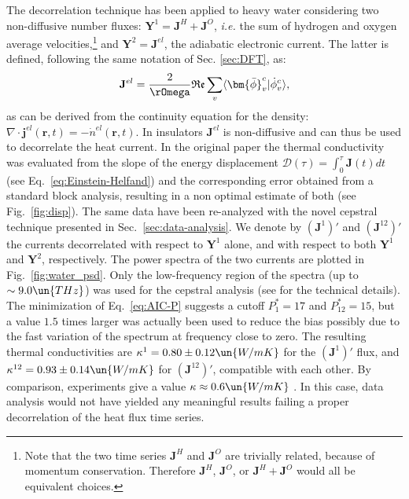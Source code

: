 The decorrelation technique has been applied to heavy water considering two non-diffusive number fluxes: $\mathbf{Y}^1 = \mathbf{J}^H + \mathbf{J}^O$,  \emph{i.e.} the sum of hydrogen and oxygen average velocities,\footnote{Note that the two time series $\mathbf{J}^H$ and $\mathbf{J}^O$ are trivially related, because of momentum conservation. Therefore $\mathbf{J}^H$, $\mathbf{J}^O$, or $\mathbf{J}^H+\mathbf{J}^O$ would all be equivalent choices.} and $\mathbf{Y}^2 = \mathbf{J}^{el}$, the adiabatic electronic current. The latter is defined, following the same notation of Sec. \ref{sec:DFT}, as:
\begin{equation}
 \mathbf J^{el} = \frac{2}{\rOmega}\mathfrak{Re} \sum_{v} \langle\bm{\bar \phi}_v^c |\dot \phi_v^c \rangle ,
\end{equation}
as can be derived from the continuity equation for the density: $\nabla\cdot \bm j^{el}(\bm r,t) =- \dot{n}^{el}(\bm r,t)$. In insulators $\mathbf J^{el}$ is non-diffusive and can thus be used to decorrelate the heat current. In the original paper the thermal conductivity was evaluated from the slope of the energy displacement $\mathcal{D}(\tau)=\int_0^\tau \mathbf{J}(t)dt$ (see Eq.~\eqref{eq:Einstein-Helfand}) and the corresponding error obtained from a standard block analysis, resulting in a non optimal estimate of both (see Fig.~\ref{fig:disp}). The same data have been re-analyzed with the novel cepstral technique presented in Sec.~\ref{sec:data-analysis}. We denote by $\left( \mathbf{J}^1\right)'$ and $\left (\mathbf{J}^{12} \right )'$ the currents decorrelated with respect to $\mathbf{Y}^1$ alone, and with respect to both $\mathbf{Y}^1$ and $\mathbf{Y}^2$, respectively. The power spectra of the two currents are plotted in Fig.~\ref{fig:water_psd}. Only the low-frequency region of the spectra (up to $\sim 9.0 \un{THz} $) was used for the cepstral analysis (see \cite{Ercole2017} for the technical details).  The minimization of Eq.~\eqref{eq:AIC-P} suggests a cutoff $P^*_1=17$ and $P^*_{12}=15$, but a value $1.5$ times larger was actually been used to reduce the bias possibly due to the fast variation of the spectrum at frequency close to zero. The resulting thermal conductivities are $\kappa^1 =  0.80 \pm 0.12 \un{W/mK}$ for the $\left( \mathbf{J}^1 \right)'$ flux, and $\kappa^{12} = 0.93 \pm 0.14 \un{W/mK}$ for $\left ( \mathbf{J}^{12} \right )'$, compatible with each other. By comparison, experiments give a value $\kappa\approx 0.6\un{W/mK}$ \citep{Matsunaga,Ramires}.
In this case, data analysis would not have yielded any meaningful results failing a proper decorrelation of the heat flux time series.

